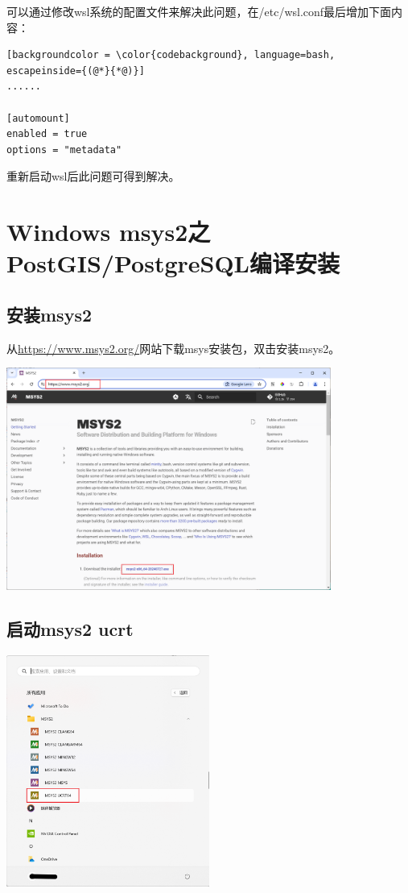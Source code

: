 可以通过修改wsl系统的配置文件来解决此问题，在/etc/wsl.conf最后增加下面内容：
\begin{lstlisting}[backgroundcolor = \color{codebackground}, language=bash, escapeinside={(@*}{*@)}]
......

[automount]
enabled = true
options = "metadata"

\end{lstlisting}

重新启动wsl后此问题可得到解决。


\chapter{Windows msys2之PostGIS/PostgreSQL编译安装}

\section{安装msys2}
从\href{https://www.msys2.org/}{https://www.msys2.org/}网站下载msys安装包，双击安装msys2。

\begin{center}
	\includegraphics[width=0.8\textwidth]{03install/msys2_download.png}
\end{center}



\section{启动msys2 ucrt}
\begin{center}
	\includegraphics[width=0.5\textwidth]{03install/msys2_start.png}
\end{center}

